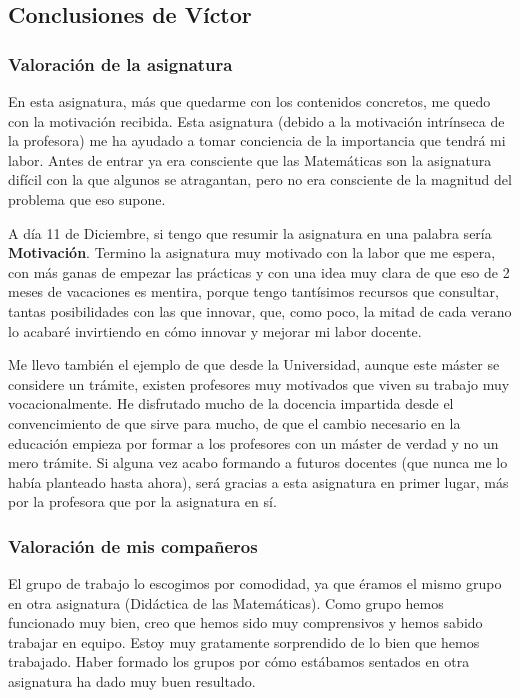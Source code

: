 \subsection{Conclusiones de Víctor}
\begin{leftbar}{\victorcolor}

\subsubsection{Valoración de la asignatura}

En esta asignatura, más que quedarme con los contenidos concretos, me quedo con la motivación recibida.
%
Esta asignatura (debido a la motivación intrínseca de la profesora) me ha ayudado a tomar conciencia de la importancia que tendrá mi labor. 
%
Antes de entrar ya era consciente que las Matemáticas son la asignatura difícil con la que algunos se atragantan, pero no era consciente de la magnitud del problema que eso supone.

A día 11 de Diciembre, si tengo que resumir la asignatura en una palabra sería \textbf{Motivación}. 
%
Termino la asignatura muy motivado con la labor que me espera, con más ganas de empezar las prácticas y con una idea muy clara de que eso de 2 meses de vacaciones es mentira, porque tengo tantísimos recursos que consultar, tantas posibilidades con las que innovar, que, como poco, la mitad de cada verano lo acabaré invirtiendo en cómo innovar y mejorar mi labor docente.

Me llevo también el ejemplo de que desde la Universidad, aunque este máster se considere un trámite, existen profesores muy motivados que viven su trabajo muy vocacionalmente. 
%
He disfrutado mucho de la docencia impartida desde el convencimiento de que sirve para mucho, de que el cambio necesario en la educación empieza por formar a los profesores con un máster de verdad y no un mero trámite. Si alguna vez acabo formando a futuros docentes (que nunca me lo había planteado hasta ahora), será gracias a esta asignatura en primer lugar, más por la profesora que por la asignatura en sí. 

\subsubsection{Valoración de mis compañeros}

El grupo de trabajo lo escogimos por comodidad, ya que éramos el mismo grupo en otra asignatura (Didáctica de las Matemáticas).
%
Como grupo hemos funcionado muy bien, creo que hemos sido muy comprensivos y hemos sabido trabajar en equipo.
%
Estoy muy gratamente sorprendido de lo bien que hemos trabajado. Haber formado los grupos por cómo estábamos sentados en otra asignatura ha dado muy buen resultado.


\end{leftbar}
